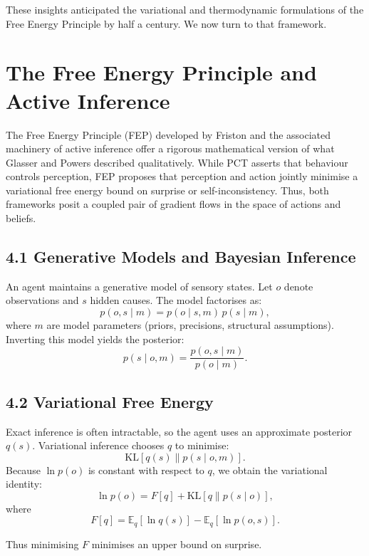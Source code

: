 \documentclass[11pt,a4paper,twoside]{article}
\begin{document}
These insights anticipated the variational and thermodynamic formulations
of the Free Energy Principle by half a century.
We now turn to that framework.

\newpage


\section{The Free Energy Principle and Active Inference}

The Free Energy Principle (FEP) developed by Friston
\cite{friston2009free,friston2010free,friston2016deep}
and the associated machinery of active inference offer a rigorous mathematical version
of what Glasser and Powers described qualitatively.
While PCT asserts that behaviour controls perception,
FEP proposes that perception and action jointly minimise a variational free energy bound
on surprise or self-inconsistency.
Thus, both frameworks posit a coupled pair of gradient flows in the space of actions and beliefs.

\subsection*{4.1 Generative Models and Bayesian Inference}

An agent maintains a generative model of sensory states.
Let $o$ denote observations and $s$ hidden causes.
The model factorises as:
\[
p(o,s\mid m) = p(o\mid s,m)\,p(s\mid m),
\]
where $m$ are model parameters (priors, precisions, structural assumptions).
Inverting this model yields the posterior:
\[
p(s\mid o,m) = \frac{p(o,s\mid m)}{p(o\mid m)}.
\]

\subsection*{4.2 Variational Free Energy}

Exact inference is often intractable, so the agent uses an approximate posterior $q(s)$.
Variational inference chooses $q$ to minimise:
\[
\mathrm{KL}[q(s)\|p(s\mid o,m)].
\]
Because $\ln p(o)$ is constant with respect to $q$,
we obtain the variational identity:
\[
\ln p(o) = F[q] + \mathrm{KL}[q\|p(s\mid o)],
\]
where
\[
F[q] = \mathbb{E}_q[\ln q(s)] - \mathbb{E}_q[\ln p(o,s)].
\]

Thus minimising $F$ minimises an upper bound on surprise.
\end{document}
